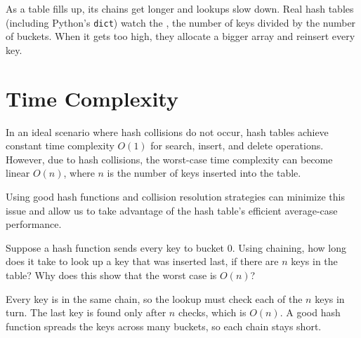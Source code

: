 As a table fills up, its chains get longer and lookups slow down. Real
hash tables (including Python's \texttt{dict}) watch the , the number of keys divided by the number of
buckets. When it gets too high, they allocate a bigger array and reinsert
every key.

\section{Time Complexity}

In an ideal scenario where hash collisions do not occur, hash tables
achieve constant time complexity $O(1)$ for search, insert, and delete
operations. However, due to hash collisions, the worst-case time
complexity can become linear $O(n)$, where $n$ is the number of keys
inserted into the table.

Using good hash functions and collision resolution strategies can
minimize this issue and allow us to take advantage of the hash table's
efficient average-case performance.

\begin{Exercise}[title={Worst Case}, label=hash3]
Suppose a hash function sends every key to bucket 0. Using chaining, how long does it take to look up a key that was inserted last, if there are $n$ keys in the table? Why does this show that the worst case is $O(n)$?
\end{Exercise}
\begin{Answer}[ref=hash3]
Every key is in the same chain, so the lookup must check each of the $n$ keys in turn. The last key is found only after $n$ checks, which is $O(n)$. A good hash function spreads the keys across many buckets, so each chain stays short.
\end{Answer}
